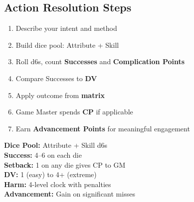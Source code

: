 \begin{multicols}{2}
\section{Action Resolution Steps}

\begin{enumerate}
  \item Describe your intent and method
  \item Build dice pool: Attribute + Skill
  \item Roll d6s, count \textbf{Successes} and \textbf{Complication Points}
  \item Compare Successes to \textbf{DV}
  \item Apply outcome from \textbf{matrix}
  \item Game Master spends \textbf{CP} if applicable
  \item Earn \textbf{Advancement Points} for meaningful engagement
\end{enumerate}

\begin{tcolorbox}[colback=blue!5!white,colframe=blue!75!black,title=Quick Reference,fonttitle=\bfseries]
\textbf{Dice Pool:} Attribute + Skill d6s \\
\textbf{Success:} 4--6 on each die \\
\textbf{Setback:} 1 on any die gives CP to GM \\
\textbf{DV:} 1 (easy) to 4+ (extreme) \\
\textbf{Harm:} 4-level clock with penalties \\
\textbf{Advancement:} Gain on significant misses 
\end{tcolorbox}

\end{multicols}
